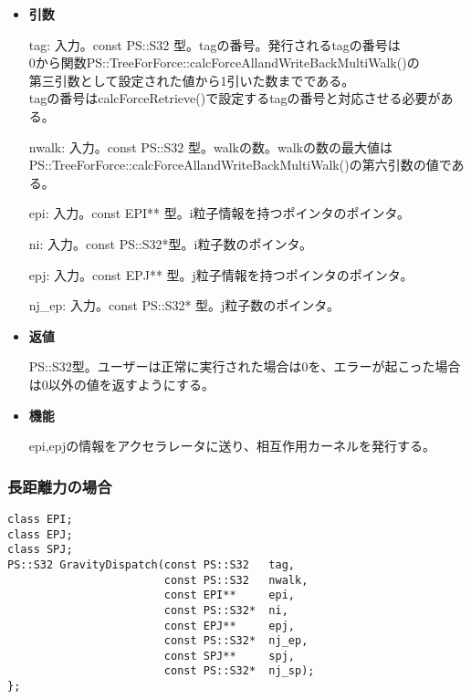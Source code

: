 \begin{itemize}

\item {\bf 引数}

  tag: 入力。const PS::S32 型。tagの番号。発行されるtagの番号は\\
  0から関数PS::TreeForForce::calcForceAllandWriteBackMultiWalk()の\\
  第三引数として設定された値から1引いた数までである。\\
  tagの番号はcalcForceRetrieve()で設定するtagの番号と対応させる必要がある。
    

  nwalk: 入力。const PS::S32 型。walkの数。walkの数の最大値は\\
  PS::TreeForForce::calcForceAllandWriteBackMultiWalk()の第六引数の値である。

  epi: 入力。const EPI** 型。i粒子情報を持つポインタのポインタ。

  ni: 入力。const PS::S32*型。i粒子数のポインタ。

  epj: 入力。const EPJ** 型。j粒子情報を持つポインタのポインタ。
  
  nj\_ep: 入力。const PS::S32* 型。j粒子数のポインタ。

\item {\bf 返値}

  PS::S32型。ユーザーは正常に実行された場合は0を、エラーが起こった場合
  は0以外の値を返すようにする。
  
\item {\bf 機能}

epi,epjの情報をアクセラレータに送り、相互作用カーネルを発行する。
  
\end{itemize}

\subsubsection{長距離力の場合}

\begin{lstlisting}[caption=calcForceDispatch]
class EPI;
class EPJ;
class SPJ;
PS::S32 GravityDispatch(const PS::S32   tag,
                        const PS::S32   nwalk,
                        const EPI**     epi,
                        const PS::S32*  ni,
                        const EPJ**     epj,
                        const PS::S32*  nj_ep,
                        const SPJ**     spj,
                        const PS::S32*  nj_sp);
};
\end{lstlisting}

